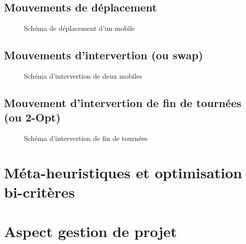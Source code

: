 		\subsection{Mouvements de déplacement}
			\begin{figure}[h!]
			\begin{subfigure}[b]{.54\linewidth}
				\centering
				\begin{tikzpicture}[schema]
					
				\end{tikzpicture}
				\label{subfig:move_move1route}
			\end{subfigure}
			\hfill
			\begin{subfigure}[b]{.45\linewidth}
				\centering
				\begin{tikzpicture}[schema]
					
				\end{tikzpicture}
				\label{subfig:move_move2routes}
			\end{subfigure}
			\caption{Schéma de déplacement d'un mobile}
			\label{fig:move_move}
			\end{figure}

		\subsection{Mouvements d'intervertion (ou swap)}
			\begin{figure}[h!]
			\begin{subfigure}[b]{.54\linewidth}
				\centering
				\begin{tikzpicture}[schema]
					
				\end{tikzpicture}
				\label{subfig:move_swap1route}
			\end{subfigure}
			\hfill
			\begin{subfigure}[b]{.45\linewidth}
				\centering
				\begin{tikzpicture}[schema]
					
				\end{tikzpicture}
				\label{subfig:move_swap2routes}
			\end{subfigure}
			\caption{Schéma d'intervertion de deux mobiles}
			\label{fig:move_swap}
			\end{figure}

		\subsection{Mouvement d'intervertion de fin de tournées (ou 2-Opt)}
			\begin{figure}[h!]
			\centering
			\begin{tikzpicture}[schema]
				
			\end{tikzpicture}
			\caption{Schéma d'intervertion de fin de tournées}
			\label{fig:move_2opt}
			\end{figure}

    \section{Méta-heuristiques et optimisation bi-critères}
    \section{Aspect gestion de projet}
